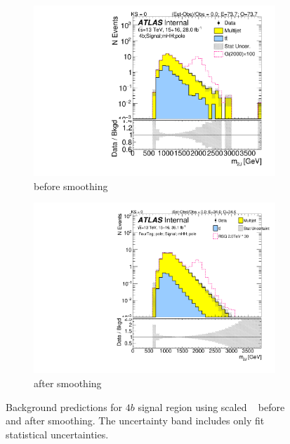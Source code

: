 \begin{figure}[htb!]
  \centering
  \captionsetup{justification=centering}
    \begin{subfigure}[b]{0.41\textwidth}
        \includegraphics[width=\textwidth,angle=-90]{figures/boosted/Signal/b77_FourTag_Signal_mHH_pole_1_blind.pdf}
        \caption{before smoothing}
        \label{fig:signal-region-mjjscaled-smoothing-4b-qcd}
    \end{subfigure}
    \quad \quad \quad 
    \begin{subfigure}[b]{0.41\textwidth}
        \includegraphics[width=\textwidth,angle=-90]{figures/boosted/Smooth/Moriond_bkg_9_FourTag_pole_Signal_mHH_pole_1_blind.pdf}
        \caption{after smoothing}
        \label{fig:signal-region-mjjscaled-smoothing-4b-ttbar}
    \end{subfigure}
    \caption{Background predictions for $4b$ signal region using scaled \mtwoJ~ before and after smoothing. The uncertainty band includes only fit statistical uncertainties.}
  \label{fig:signal-region-mjjscaled-smooth-bkg-nosys-4b}
\end{figure}


